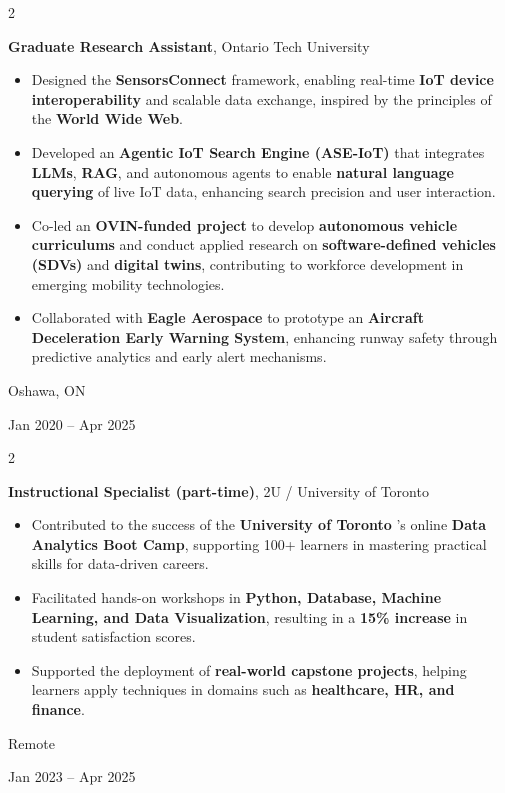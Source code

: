\documentclass[10pt, letterpaper]{article}
\newenvironment{highlights}{
    \begin{itemize}[
        topsep=0.10 cm,
        parsep=0.10 cm,
        partopsep=0pt,
        itemsep=0pt,
        leftmargin=0.4 cm + 10pt
    ]
}{
    \end{itemize}
} %
\newenvironment{twocolentry}[2][]{
    \onecolentry
    \def\secondColumn{#2}
    \setcolumnwidth{\fill, 4.5 cm}
    \begin{paracol}{2}
}{
    \switchcolumn \raggedleft \secondColumn
    \end{paracol}
    \endonecolentry
} %
\begin{document}
        \begin{twocolentry}{
    Oshawa, ON

    Jan 2020 – Apr 2025
    }
    \textbf{Graduate Research Assistant}, Ontario Tech University
    \begin{highlights}
        \item Designed the \textbf{SensorsConnect} framework, enabling real-time \textbf{IoT device interoperability} and scalable data exchange, inspired by the principles of the \textbf{World Wide Web}.
        \item Developed an \textbf{Agentic IoT Search Engine (ASE-IoT)} that integrates \textbf{LLMs}, \textbf{RAG}, and autonomous agents to enable \textbf{natural language querying} of live IoT data, enhancing search precision and user interaction.
        \item Co-led an \textbf{OVIN-funded project} to develop \textbf{autonomous vehicle curriculums} and conduct applied research on \textbf{software-defined vehicles (SDVs)} and \textbf{digital twins}, contributing to workforce development in emerging mobility technologies.
        \item Collaborated with \textbf{Eagle Aerospace} to prototype an \textbf{Aircraft Deceleration Early Warning System}, enhancing runway safety through predictive analytics and early alert mechanisms.
    \end{highlights}
\end{twocolentry}

\vspace{0.3 cm}
\begin{twocolentry}{
    Remote

    Jan 2023 – Apr 2025
}
    \textbf{Instructional Specialist (part-time)}, 2U / University of Toronto

    \begin{highlights}
        \item Contributed to the success of the \textbf{University of Toronto} 's online \textbf{Data Analytics Boot Camp}, supporting 100+ learners in mastering practical skills for data-driven careers.
        \item Facilitated hands-on workshops in \textbf{Python, Database, Machine Learning, and Data Visualization}, resulting in a \textbf{15\% increase} in student satisfaction scores.
        \item Supported the deployment of \textbf{real-world capstone projects}, helping learners apply techniques in domains such as \textbf{healthcare, HR, and finance}.
    \end{highlights}
\end{twocolentry}
\end{document}
